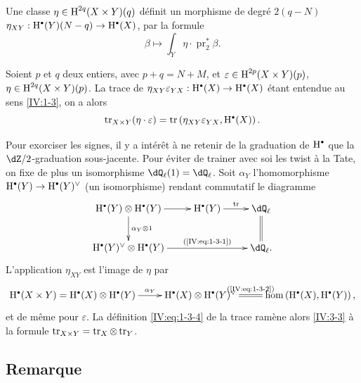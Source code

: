 \subsection{}\label{IV:3-2}

Une classe $\eta\in \operatorname{H}^{2 q}(X\times Y)(q)$ définit un morphisme de degré 
$2(q-N)$ $\eta_{XY}:\h^\bullet(Y)(N-q)\to \h^\bullet(X)$, par la formule 
\[
  \beta \mapsto \int_Y \eta\cdot \operatorname{pr}_2^\ast \beta \text{.}
\]





\begin{proposition_}\label{IV:3-3}
Soient $p$ et $q$ deux entiers, avec $p+q=N+M$, et 
$\varepsilon\in \operatorname{H}^{2 p}(X\times Y)(p)$, $\eta\in \operatorname{H}^{2 q}(X\times Y)(p)$. La 
trace de $\eta_{X Y}\varepsilon_{Y X}:\h^\bullet(X)\to \h^\bullet(X)$ étant 
entendue au sens \ref{IV:1-3}, on a alors 
\[
  \tr_{X\times Y}(\eta\cdot \varepsilon) = \tr\left(\eta_{X Y}\varepsilon_{Y X},\h^\bullet(X)\right) \text{.}
\]
\end{proposition_}

Pour exorciser les signes, il y a intérêt à ne retenir de la graduation 
de $\h^\bullet$ que la $\dZ/2$-graduation sous-jacente. Pour éviter de 
trainer avec soi les twist à la Tate, on fixe de plus un isomorphisme 
$\dQ_\ell(1)=\dQ_\ell$. Soit $\alpha_Y$ l'homomorphisme 
$\h^\bullet(Y)\to \h^\bullet(Y)^\vee$ (un isomorphisme) rendant commutatif le 
diagramme 
\[\xymatrix{
  \h^\bullet(Y)\otimes \h^\bullet(Y) \ar[r] \ar[d]^-{\alpha_Y\otimes 1} 
    & \h^\bullet(Y) \ar[r]^-{\tr} 
    & \dQ_\ell \ar@{=}[d] \\
  \h^\bullet(Y)^\vee \otimes \h^\bullet(Y) \ar[rr]^-{\text{(\ref{IV:eq:1-3-1})}} 
    & & \dQ_\ell \text{.}
}\]
L'application $\eta_{X Y}$ est l'image de $\eta$ par 
\[\xymatrix{
  \h^\bullet(X\times Y) = \h^\bullet(X)\otimes \h^\bullet(Y) \ar[r]^-{\alpha_Y} 
    & \h^\bullet(X) \otimes \h^\bullet(Y)^\vee \ar@{=}[r]^-{\text{(\ref{IV:eq:1-3-2})}} 
    & \hom\left(\h^\bullet(X),\h^\bullet(Y)\right) \text{,}
}\]
et de même pour $\varepsilon$. La définition \ref{IV:eq:1-3-4} de la trace 
ramène alors \ref{IV:3-3} à la formule 
$\operatorname{tr}_{X\times Y}=\operatorname{tr}_X\otimes \operatorname{tr}_Y$. 





\subsection{Remarque}\label{IV:3-4}

